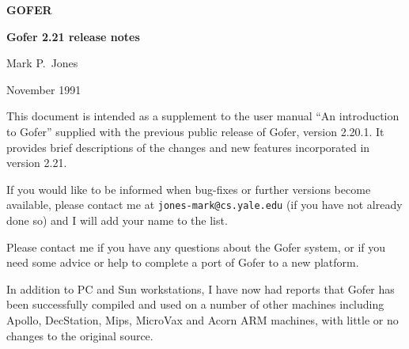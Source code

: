 \setcounter{tocdepth}{3}
\setcounter{secnumdepth}{3}
\makeatletter
\def\@dottedtocline#1#2#3#4#5{\ifnum #1>\c@tocdepth \else
  \vskip \z@ plus .2pt
  {\leftskip #2\relax \rightskip \@tocrmarg \parfillskip -\rightskip
    \parindent #2\relax\@afterindenttrue
   \interlinepenalty\@M
   \leavevmode 
   \@tempdima #3\relax \advance\leftskip \@tempdima \hbox{}\hskip -\leftskip
    \mbox{#4}\nobreak%
    \mbox{{\sl ~~~#5}}
    \hfill{ }
   \par
}\fi}

  \def\l@section#1#2{\pagebreak[3]
   \vskip 1.0em plus 1pt \@tempdima 1.5em \begingroup
   \parindent \z@ \leftskip\@tempdima \rightskip \@pnumwidth
   \hspace{6mm}
   \bf \leavevmode \hbox{}\hskip-\@tempdima\relax #1 %
   {\sl ~~~#2}\hfil
   \endgroup}
\makeatother



\thispagestyle{empty}
\vspace*{15mm}
\begin{center}
{\Huge\bf GOFER}
\vspace{5mm}

{\Large\bf Gofer 2.21 release notes}
\vspace{5cm}

{\Large Mark P.~Jones}
\vspace{10mm}

{\Large November 1991}
\vspace{3cm}

\end{center}
\setcounter{page}{0}
\newpage
\tableofcontents

\setlength{\parindent}{0pt}
\setlength{\parskip}{3pt}
\newpage
This document is intended as a supplement to the user manual ``An
introduction to Gofer'' supplied with the previous public release of
Gofer, version 2.20.1.  It provides brief descriptions of the changes
and new features incorporated in version 2.21.

If you would like to be informed when bug-fixes or further versions
become available, please contact me at \verb"jones-mark@cs.yale.edu" (if you
have not already done so) and I will add your name to the list.

Please contact me if you have any questions about the Gofer system, or
if you need some advice or help to complete a port of Gofer to a new
platform.

In addition to PC and Sun workstations, I have now had reports that
Gofer has been successfully compiled and used on a number of other
machines including Apollo, DecStation, Mips, MicroVax and Acorn ARM
machines, with little or no changes to the original source.

